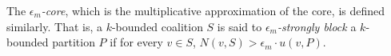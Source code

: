 \documentclass[sigconf]{aamas}
\begin{document}
The \emph{$\epsilon_m$-core}, which is the multiplicative approximation of the core, is defined similarly. That is, a $k$-bounded coalition $S$ is said to \emph{$\epsilon_m$-strongly block} a $k$-bounded partition $P$ if for every $v \in S$, $N(v,S) > \epsilon_m \cdot u(v,P)$.





\end{document}
